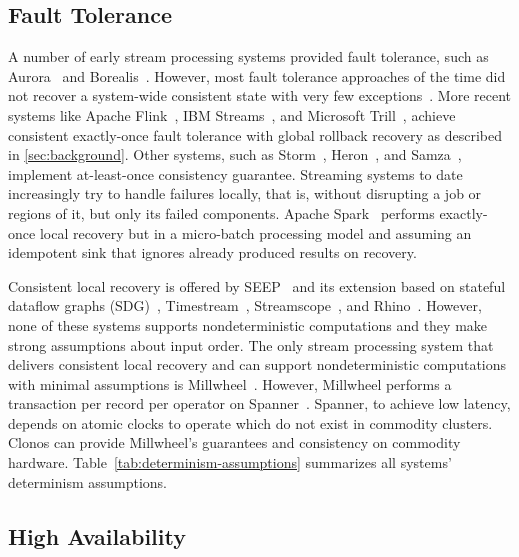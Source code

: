 \documentclass[sigconf]{acmart}
\begin{document}
\subsection{Fault Tolerance}
A number of early stream processing systems provided fault tolerance, such as Aurora~\cite{CherniackBB03} and Borealis~\cite{BalazinskaBM05}. However, most fault tolerance approaches of the time did not recover a system-wide consistent state  with very few exceptions~\cite{Shah2004highly}.
More recent systems like Apache Flink~\cite{CarboneKE15}, IBM Streams~\cite{SilvaZD16}, and Microsoft Trill~\cite{ChandramouliGB15}, achieve consistent exactly-once fault tolerance with global rollback recovery as described in \autoref{sec:background}. Other systems, such as Storm~\cite{ToshniwalT14}, Heron~\cite{KulkarniBF15}, and Samza~\cite{NoghabiPP17}, implement at-least-once consistency guarantee.
Streaming systems to date increasingly try to handle failures locally, that is, without disrupting a job or regions of it, but only its failed components.
Apache Spark~\cite{ArmbrustDT18} performs exactly-once local recovery but in a micro-batch processing model and assuming an idempotent sink that ignores already produced results on recovery.

Consistent local recovery is offered by SEEP~\cite{FernandezMK13} and its extension based on stateful dataflow graphs (SDG)~\cite{FernandezMK14}, Timestream~\cite{QianHS13}, Streamscope~\cite{LinHZ16}, and Rhino~\cite{delmonte2020rhino}. However, none of these systems supports nondeterministic computations and they make strong assumptions about input order.
The only stream processing system that delivers consistent local recovery and can support nondeterministic computations with minimal assumptions is Millwheel~\cite{akidau2013millwheel}. However, Millwheel performs a transaction per record per operator on Spanner~\cite{spanner}. Spanner, to achieve low latency, depends on atomic clocks to operate which do not exist in commodity clusters. Clonos can provide Millwheel's guarantees and consistency on commodity hardware.
Table~\ref{tab:determinism-assumptions} summarizes all systems' determinism assumptions.




\subsection{High Availability}
\end{document}
